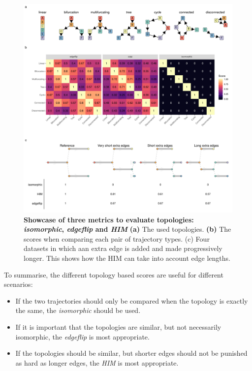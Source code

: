 \begin{figure}
	\centering\includegraphics[width=\linewidth]{fig/dynbenchmark/snote1fig_2.pdf}
	\caption{
		\textbf{Showcase of three metrics to evaluate topologies: \textit{isomorphic}, \textit{edgeflip} and \textit{HIM}}
		\textbf{(a)} The used topologies. \textbf{(b)} The scores when comparing each pair of trajectory types. (c) Four datasets in which aan extra edge is added and made progressively longer. This shows how the HIM can take into account edge lengths.
	}
	\label{fig:snote1fig_2}
\end{figure}

To summarise, the different topology based scores are useful for different scenarios:

\begin{itemize}
	\item If the two trajectories should only be compared when the topology is exactly the same, the \textit{isomorphic} should be used.
	\item If it is important that the topologies are similar, but not necessarily isomorphic, the \textit{edgeflip} is most appropriate.
	\item If the topologies should be similar, but shorter edges should not be punished as hard as longer edges, the \textit{HIM} is most appropriate.
\end{itemize}

